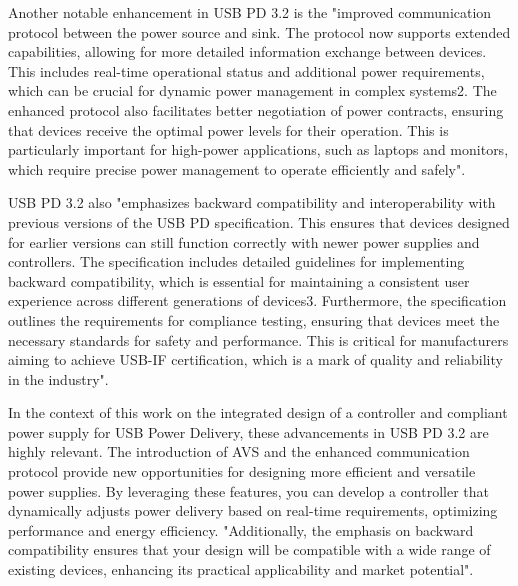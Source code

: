 Another notable enhancement in USB PD 3.2 is the "improved communication protocol between the power source and sink. The protocol now supports extended capabilities, allowing for more detailed information exchange between devices. This includes real-time operational status and additional power requirements, which can be crucial for dynamic power management in complex systems2. The enhanced protocol also facilitates better negotiation of power contracts, ensuring that devices receive the optimal power levels for their operation. This is particularly important for high-power applications, such as laptops and monitors, which require precise power management to operate efficiently and safely"\cite{usb_3.2_products}.

USB PD 3.2 also "emphasizes backward compatibility and interoperability with previous versions of the USB PD specification. This ensures that devices designed for earlier versions can still function correctly with newer power supplies and controllers. The specification includes detailed guidelines for implementing backward compatibility, which is essential for maintaining a consistent user experience across different generations of devices3. Furthermore, the specification outlines the requirements for compliance testing, ensuring that devices meet the necessary standards for safety and performance. This is critical for manufacturers aiming to achieve USB-IF certification, which is a mark of quality and reliability in the industry"\cite{usb_if_usb_charger}.

In the context of this work on the integrated design of a controller and compliant power supply for USB Power Delivery, these advancements in USB PD 3.2 are highly relevant. The introduction of AVS and the enhanced communication protocol provide new opportunities for designing more efficient and versatile power supplies. By leveraging these features, you can develop a controller that dynamically adjusts power delivery based on real-time requirements, optimizing performance and energy efficiency. "Additionally, the emphasis on backward compatibility ensures that your design will be compatible with a wide range of existing devices, enhancing its practical applicability and market potential"\cite{usb_power_delivery}.
